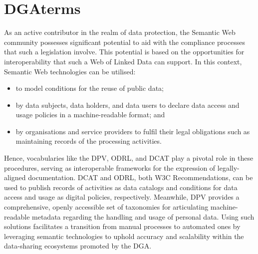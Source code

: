 \section{DGAterms}
\label{sec:dgaterms}

As an active contributor in the realm of data protection, the Semantic Web community possesses significant potential to aid with the compliance processes that such a legislation involve.
This potential is based on the opportunities for interoperability that such a Web of Linked Data can support.
In this context, Semantic Web technologies can be utilised:

\begin{itemize}
    \item to model conditions for the reuse of public data;
    \item by data subjects, data holders, and data users to declare data access and usage policies in a machine-readable format; and
    \item by organisations and service providers to fulfil their legal obligations such as maintaining records of the processing activities.
\end{itemize}

Hence, vocabularies like the DPV, ODRL, and DCAT play a pivotal role in these procedures, serving as interoperable frameworks for the expression of legally-aligned documentation.
DCAT and ODRL, both W3C Recommendations, can be used to publish records of activities as data catalogs and conditions for data access and usage as digital policies, respectively.
Meanwhile, DPV provides a comprehensive, openly accessible set of taxonomies for articulating machine-readable metadata regarding the handling and usage of personal data.
Using such solutions facilitates a transition from manual processes to automated ones by leveraging semantic technologies to uphold accuracy and scalability within the data-sharing ecosystems promoted by the DGA.


